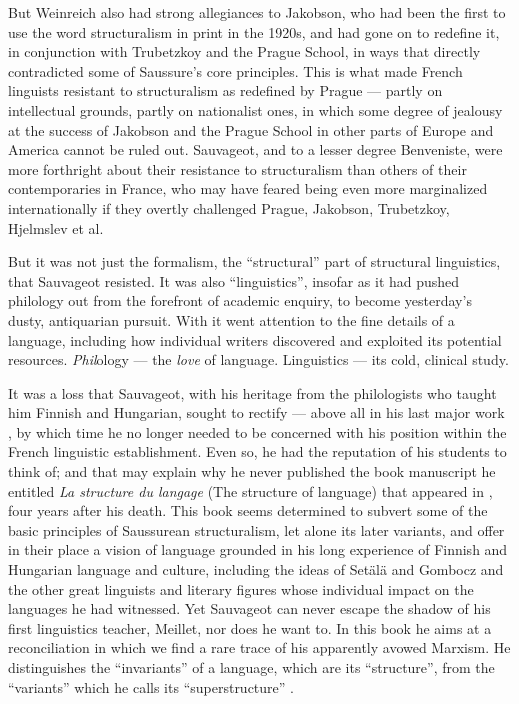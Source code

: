 \documentclass[output=paper]{langscibook}
\begin{document}
But Weinreich also had strong allegiances to Jakobson, who had been the first to use the word structuralism in print in the 1920s, and had gone on to redefine it, in conjunction with Trubetzkoy and the Prague School, in ways that directly contradicted some of Saussure's core principles. This is what made French linguists resistant to structuralism as redefined by Prague — partly on intellectual grounds, partly on nationalist ones, in which some degree of jealousy at the success of Jakobson and the Prague School in other parts of Europe and America cannot be ruled out. Sauvageot, and to a lesser degree Benveniste, were more forthright about their resistance to structuralism than others of their contemporaries in France, who may have feared being even more marginalized internationally if they overtly challenged Prague, Jakobson, Trubetzkoy, Hjelmslev et al.

But it was not just the formalism, the ``structural'' part of structural linguistics, that Sauvageot resisted. It was also ``linguistics'', insofar as it had pushed philology out from the forefront of academic enquiry, to become yesterday's dusty, antiquarian pursuit. With it went attention to the fine details of a language, including how individual writers discovered and exploited its potential resources. \emph{Phil}ology — the \emph{love} of language. Linguistics — its cold, clinical study.

It was a loss that Sauvageot, with his heritage from the philologists who taught him Finnish and Hungarian, sought to rectify — above all in his last major work \citep{Sauvageot1973}, by which time he no longer needed to be concerned with his position within the French linguistic establishment. Even so, he had the reputation of his students to think of; and that may explain why he never published the book manuscript he entitled \emph{La structure du langage} (The structure of language) that appeared in \citeyear{Sauvageot1992}, four years after his death. This book seems determined to subvert some of the basic principles of Saussurean structuralism, let alone its later variants, and offer in their place a vision of language grounded in his long experience of Finnish and Hungarian language and culture, including the ideas of Setälä and Gombocz and the other great linguists and literary figures whose individual impact on the languages he had witnessed. Yet Sauvageot can never escape the shadow of his first linguistics teacher, Meillet, nor does he want to. In this book he aims at a reconciliation in which we find a rare trace of his apparently avowed Marxism. He distinguishes the ``invariants'' of a language, which are its ``structure'', from the ``variants'' which he calls its ``superstructure'' \citep[18]{Sauvageot1992}.
\end{document}
